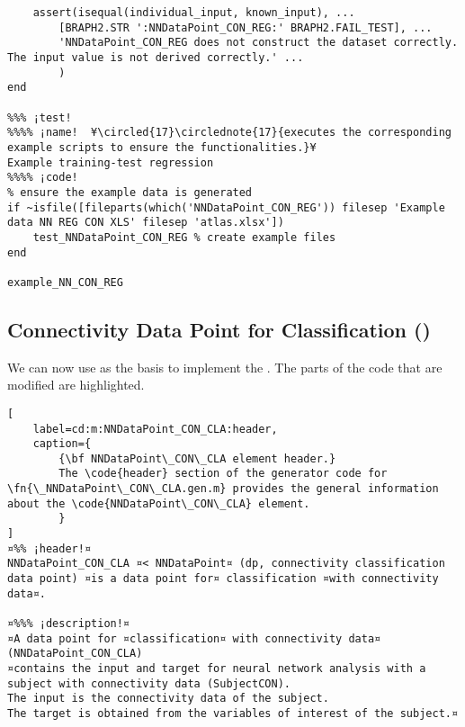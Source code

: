 \documentclass{tufte-handout}
\begin{document}
\begin{lstlisting}
    assert(isequal(individual_input, known_input), ...
        [BRAPH2.STR ':NNDataPoint_CON_REG:' BRAPH2.FAIL_TEST], ...
        'NNDataPoint_CON_REG does not construct the dataset correctly. The input value is not derived correctly.' ...
        )
end

%%% ¡test! 
%%%% ¡name!  ¥\circled{17}\circlednote{17}{executes the corresponding example scripts to ensure the functionalities.}¥
Example training-test regression
%%%% ¡code!
% ensure the example data is generated
if ~isfile([fileparts(which('NNDataPoint_CON_REG')) filesep 'Example data NN REG CON XLS' filesep 'atlas.xlsx'])
    test_NNDataPoint_CON_REG % create example files
end

example_NN_CON_REG

\end{lstlisting}

\clearpage
\subsection{Connectivity Data Point for Classification ()}

We can now use  as the basis to implement the .
The parts of the code that are modified are highlighted. 

\begin{lstlisting}[
	label=cd:m:NNDataPoint_CON_CLA:header,
	caption={
		{\bf NNDataPoint\_CON\_CLA element header.}
		The \code{header} section of the generator code for \fn{\_NNDataPoint\_CON\_CLA.gen.m} provides the general information about the \code{NNDataPoint\_CON\_CLA} element.
		}
]
¤%% ¡header!¤
NNDataPoint_CON_CLA ¤< NNDataPoint¤ (dp, connectivity classification data point) ¤is a data point for¤ classification ¤with connectivity data¤.

¤%%% ¡description!¤
¤A data point for ¤classification¤ with connectivity data¤ (NNDataPoint_CON_CLA) 
¤contains the input and target for neural network analysis with a subject with connectivity data (SubjectCON).
The input is the connectivity data of the subject.
The target is obtained from the variables of interest of the subject.¤
\end{lstlisting}
\end{document}
